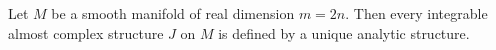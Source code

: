 \documentclass[12pt]{article}
\begin{document}
Let $M$ be a smooth manifold of real dimension $m=2n$. Then every integrable almost complex structure $J$ on $M$ is defined by a unique analytic structure.
\end{document}
